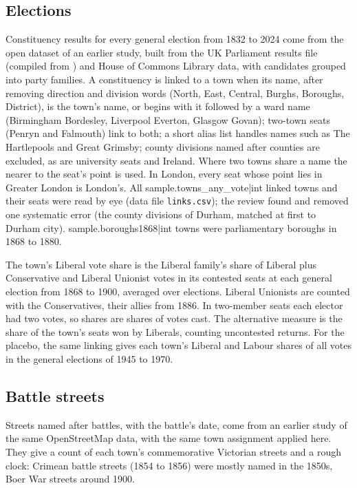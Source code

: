 \documentclass[11pt,a4paper]{article}
\begin{document}
\subsection{Elections}
Constituency results for every general election from 1832 to 2024 come from the open dataset of an earlier study, built from the UK Parliament results file (compiled from \citealp{craig1989,craig1974}) and House of Commons Library data, with candidates grouped into party families. A constituency is linked to a town when its name, after removing direction and division words (North, East, Central, Burghs, Boroughs, District), is the town's name, or begins with it followed by a ward name (Birmingham Bordesley, Liverpool Everton, Glasgow Govan); two-town seats (Penryn and Falmouth) link to both; a short alias list handles names such as The Hartlepools and Great Grimsby; county divisions named after counties are excluded, as are university seats and Ireland. Where two towns share a name the nearer to the seat's point is used. In London, every seat whose point lies in Greater London is London's. All {{sample.towns_any_vote|int}} linked towns and their seats were read by eye (data file \texttt{links.csv}); the review found and removed one systematic error (the county divisions of Durham, matched at first to Durham city). {{sample.boroughs1868|int}} towns were parliamentary boroughs in 1868 to 1880.

The town's Liberal vote share is the Liberal family's share of Liberal plus Conservative and Liberal Unionist votes in its contested seats at each general election from 1868 to 1900, averaged over elections. Liberal Unionists are counted with the Conservatives, their allies from 1886. In two-member seats each elector had two votes, so shares are shares of votes cast. The alternative measure is the share of the town's seats won by Liberals, counting uncontested returns. For the placebo, the same linking gives each town's Liberal and Labour shares of all votes in the general elections of 1945 to 1970.

\subsection{Battle streets}
Streets named after battles, with the battle's date, come from an earlier study of the same OpenStreetMap data, with the same town assignment applied here. They give a count of each town's commemorative Victorian streets and a rough clock: Crimean battle streets (1854 to 1856) were mostly named in the 1850s, Boer War streets around 1900.
\end{document}
